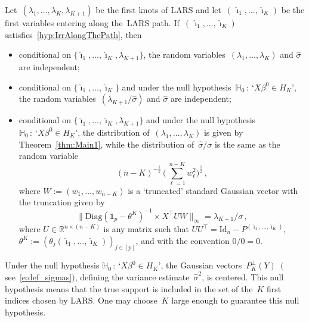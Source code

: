 \documentclass[final,numbib]{imaiai}%
\numberwithin{equation}{section}
\renewcommand{\hat}{\widehat}
\newcommand{\<}{\langle}
\renewcommand{\>}{\rangle}
\newcommand{\1}{\mathds{1}}
\begin{document}
{   \begin {proposition}\label{p:frozen}
Let~$(\lambda_1,\ldots, \lambda_K,\lambda_{K+1})$ be the first knots of LARS and let~$(\,\hat \imath_1,\ldots, \hat \imath_K)$ be the first variables entering along the~LARS path.
If~$(\,\hat \imath_1,\ldots, \hat \imath_K)$ satisfies~\eqref{hyp:IrrAlongThePath}, then  %
\begin{itemize}
\item conditional on $\{\hat\imath_1,\ldots, \hat \imath_K,\lambda_{K+1}\}$, the random variables~$( \lambda _1,\ldots,  \lambda_{K})$ and $\hat \sigma$ are independent;
\item conditional on $\{\hat\imath_1,\ldots, \hat \imath_K\}$ and under the null hypothesis~$\mathds H_0\,:\ \text{`}X\beta^0\in H_{K}\text{'}$, the random variables~$(\lambda_{K+1}/\hat\sigma)$ and $\hat \sigma$ are independent;
\item conditional on $\{\hat\imath_1,\ldots, \hat \imath_K,\lambda_{K+1}\}$ and under the null hypothesis~$\mathds H_0\,:\ \text{`}X\beta^0\in H_{K}\text{'}$, the distribution of~$ (\lambda _1,\ldots, \lambda_{K})$ is given by Theorem~\ref{thm:Main1}, while the distribution of~$\hat \sigma/\sigma$ is the same as the random variable
\[
(n-K)^{-\frac12}\,\Big({{\,\displaystyle\sum_{\ell=1}^{n-K}w_\ell^2}}\Big)^{\frac12}\,,
\]
where $W:=(w_1,\ldots,w_{n-K})$ is a ‘truncated' standard Gaussian vector with the truncation given by
\[
\|\mathrm{Diag}(\mathds{1}_p-\theta^K)^{-1}\times X^\top UW\|_\infty=\lambda_{K+1}/\sigma\,,
\]
where $U\in\mathds R^{n\times (n-K)}$ is any matrix such that $UU^\top=\mathrm{Id}_n-P^{(\hat\imath_1,\ldots, \hat \imath_K)}$, $\theta^K:=(\theta_{j}(\hat\imath_1,\ldots, \hat \imath_K))_{j\in[p]}$, and with the convention $0/0=0$.
\end{itemize}
\end{proposition}
  
  \begin{remark}
  \label{rem:centered}
Under the null hypothesis $\mathds H_0\,:\ \text{`}X\beta^0\in H_{K}\text{'}$, the Gaussian vectors~$P_{K}^\perp(Y)$~$($see~\eqref{e:def_sigmas}$)$, defining the variance estimate~$\hat \sigma^2$, is centered. This null hypothesis means that the true support is included in the set of the~$K$ first indices chosen by LARS.
One may choose~$K$ large enough to guarantee this null hypothesis.
  \end{remark}
 
\newpage

}
\end{document}
